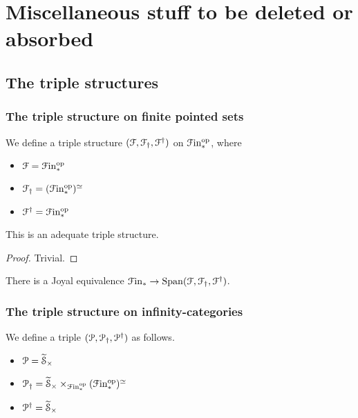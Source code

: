 \documentclass[main.tex]{subfiles}
\begin{document}
\section{Miscellaneous stuff to be deleted or absorbed}
\label{sec:miscellaneous_stuff_to_be_deleted_or_absorbed}

\subsection{The triple structures}
\label{ssc:the_triple_structures}

\subsubsection{The triple structure on finite pointed sets}
\label{sss:the_triple_structure_on_finite_pointed_sets}

We define a triple structure $(\mathcal{F}, \mathcal{F}_{\dagger}, \mathcal{F}^{\dagger})$ on $\mathcal{F}\mathrm{in}_{*}^{\mathrm{op}}$, where
\begin{itemize}
  \item $\mathcal{F} = \mathcal{F}\mathrm{in}_{*}^{\mathrm{op}}$

  \item $\mathcal{F}_{\dagger} = (\mathcal{F}\mathrm{in}_{*}^{\mathrm{op}})^{\simeq}$

  \item $\mathcal{F}^{\dagger} = \mathcal{F}\mathrm{in}_{*}^{\mathrm{op}}$
\end{itemize}

\begin{proposition}
  This is an adequate triple structure.
\end{proposition}
\begin{proof}
  Trivial.
\end{proof}

\begin{proposition}
  There is a Joyal equivalence $\mathcal{F}\mathrm{in}_{*} \to \mathrm{Span}(\mathcal{F}, \mathcal{F}_{\dagger}, \mathcal{F}^{\dagger})$.
\end{proposition}

\subsubsection{The triple structure on infinity-categories}
\label{sss:the_triple_structure_on_categories}

We define a triple $(\mathcal{P}, \mathcal{P}_{\dagger}, \mathcal{P}^{\dagger})$ as follows.
\begin{itemize}
  \item $\mathcal{P} = \widetilde{\mathcal{S}}_{\times}$

  \item $\mathcal{P}_{\dagger} = \widetilde{\mathcal{S}}_{\times} \times_{\mathcal{F}\mathrm{in}_{*}^{\mathrm{op}}}(\mathcal{F}\mathrm{in}_{*}^{\mathrm{op}})^{\simeq}$

  \item $\mathcal{P}^{\dagger} = \widetilde{\mathcal{S}}_{\times}$
\end{itemize}
\end{document}
